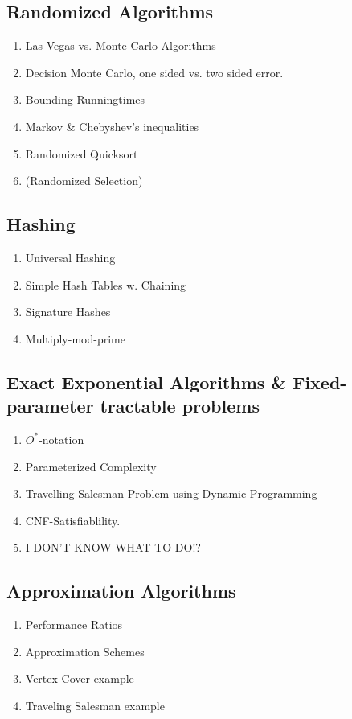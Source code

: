 \subsection{Randomized Algorithms}
\begin{enumerate}
  \item Las-Vegas vs. Monte Carlo Algorithms
  \item Decision Monte Carlo, one sided vs. two sided error.
  \item Bounding Runningtimes
  \item Markov \& Chebyshev's inequalities
  \item Randomized Quicksort
  \item (Randomized Selection)
\end{enumerate}
\newpage

\subsection{Hashing}
\begin{enumerate}
  \item Universal Hashing
  \item Simple Hash Tables w. Chaining
  \item Signature Hashes
  \item Multiply-mod-prime
\end{enumerate}
\newpage

\subsection{Exact Exponential Algorithms \& Fixed-parameter tractable problems}
\begin{enumerate}
  \item $O^*$-notation
  \item Parameterized Complexity
  \item Travelling Salesman Problem using Dynamic Programming
  \item CNF-Satisfiablility.
  \item I DON'T KNOW WHAT TO DO!?
\end{enumerate}
\newpage

\subsection{Approximation Algorithms}
\begin{enumerate}
  \item Performance Ratios
  \item Approximation Schemes
  \item Vertex Cover example
  \item Traveling Salesman example
\end{enumerate}
\newpage

